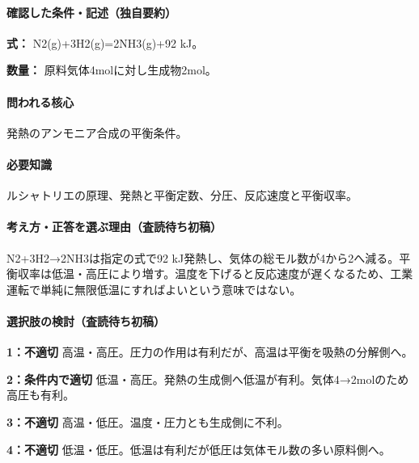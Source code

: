 \paragraph{確認した条件・記述（独自要約）}\mbox{}\par

\noindent\textbf{式：} N2(g)+3H2(g)=\allowbreak{}2NH3(g)+92 kJ。\par

\noindent\textbf{数量：} 原料気体4molに対し生成物2mol。\par

\paragraph{問われる核心} 発熱のアンモニア合成の平衡条件。

\paragraph{必要知識} ルシャトリエの原理、発熱と平衡定数、分圧、反応速度と平衡収率。

\paragraph{考え方・正答を選ぶ理由（査読待ち初稿）} N2+3H2→2NH3は指定の式で92 kJ発熱し、気体の総モル数が4から2へ減る。平衡収率は低温・高圧により増す。温度を下げると反応速度が遅くなるため、工業運転で単純に無限低温にすればよいという意味ではない。

\paragraph{選択肢の検討（査読待ち初稿）}\mbox{}\par

\noindent\textbf{1：不適切} 高温・高圧。圧力の作用は有利だが、高温は平衡を吸熱の分解側へ。\par

\noindent\textbf{2：条件内で適切} 低温・高圧。発熱の生成側へ低温が有利。気体4→2molのため高圧も有利。\par

\noindent\textbf{3：不適切} 高温・低圧。温度・圧力とも生成側に不利。\par

\noindent\textbf{4：不適切} 低温・低圧。低温は有利だが低圧は気体モル数の多い原料側へ。\par

